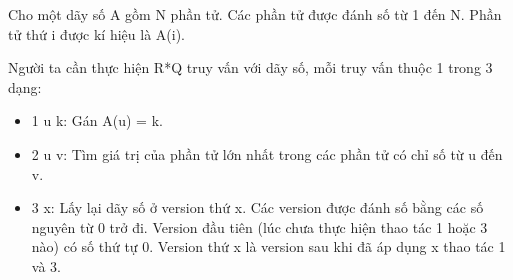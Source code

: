Cho một dãy số A gồm N phần tử. Các phần tử được đánh số từ 1 đến N. Phần tử thứ i được kí hiệu là A(i).

Người ta cần thực hiện R*Q truy vấn với dãy số, mỗi truy vấn thuộc 1 trong 3 dạng:
\begin{itemize}
	\item 1 u k: Gán A(u) = k.
	\item 2 u v: Tìm giá trị của phần tử lớn nhất trong các phần tử có chỉ số từ u đến v.
	\item 3 x: Lấy lại dãy số ở version thứ x. Các version được đánh số bằng các số nguyên từ 0 trở đi. Version đầu tiên (lúc chưa thực hiện thao tác 1 hoặc 3 nào) có số thứ tự 0. Version thứ x là version sau khi đã áp dụng x thao tác 1 và 3.
\end{itemize}